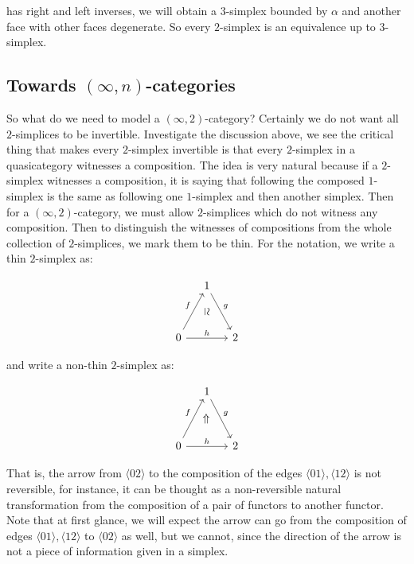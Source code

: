 \documentclass[11pt]{article}
\newcommand{\vsimeq}{\rotatebox[origin=c]{-90}{$\simeq$}}
\newcommand{\vRightarrow}{\rotatebox[origin=c]{90}{$\Rightarrow$}}
\begin{document}
has right and left inverses, we will obtain a $3$-simplex bounded by $\alpha$ and another face with other faces degenerate. So every $2$-simplex is an equivalence up to $3$-simplex.

\subsection{Towards $(\infty,n)$-categories}

So what do we need to model a $(\infty,2)$-category? Certainly we do not want all $2$-simplices to be invertible. Investigate the discussion above, we see the critical thing that makes every $2$-simplex invertible is that every $2$-simplex in a quasicategory witnesses a composition. The idea is very natural because if a $2$-simplex witnesses a composition, it is saying that following the composed $1$-simplex is  the same as following one $1$-simplex and then another simplex. Then for a $(\infty,2)$-category, we must allow $2$-simplices which do not witness any composition. Then to distinguish the witnesses of compositions from the whole collection of $2$-simplices, we mark them to be thin. For the notation, we write a thin $2$-simplex as:

\begin{equation*}
\begin{tikzcd}[column sep=small, row sep=small]
& 1 \arrow{rdd}{g} \\
& \vsimeq \\
0 \arrow{uur}{f} \arrow{rr}{h} &  & 2
\end{tikzcd}
\end{equation*}


and write a non-thin $2$-simplex as:

\begin{equation*}
\begin{tikzcd}[column sep=small, row sep=small]
& 1 \arrow{rdd}{g} \\
& \vRightarrow \\
0 \arrow{uur}{f} \arrow{rr}{h} &  & 2
\end{tikzcd}
\end{equation*}


That is, the arrow from $\langle 02\rangle$ to the composition of the edges $\langle 01\rangle,\langle 12\rangle$ is not reversible, for instance, it can be thought as a non-reversible natural transformation from the composition of a pair of functors to another functor. Note that at first glance, we will expect the arrow can go from the composition of edges $\langle 01\rangle,\langle 12\rangle$ to $\langle 02\rangle$ as well, but we cannot, since the direction of the arrow is not a piece of information given in a simplex.
\end{document}
